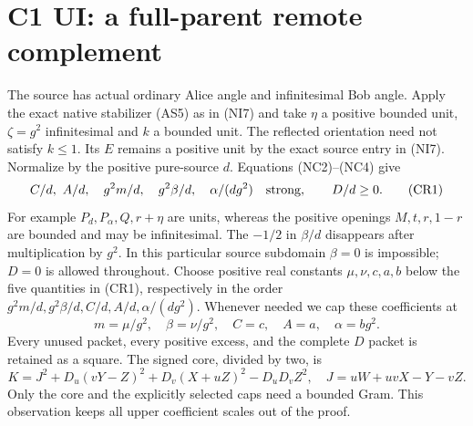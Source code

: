 \section{C1 UI: a full-parent remote complement}
\label{sec:c1-ui-remote}
The source has actual ordinary Alice angle and infinitesimal Bob
angle. Apply the exact native stabilizer (AS5) as in (NI7) and take
$\eta$ a positive bounded unit, $\zeta=g^2$ infinitesimal and $k$ a
bounded unit. The reflected orientation need not satisfy $k\le1$.
Its $E$ remains a positive unit by the exact source entry in (NI7).
Normalize by the positive pure-source $d$.
Equations (NC2)--(NC4) give
\[
 C/d,\ A/d,\quad g^2m/d,\quad g^2\beta/d,\quad
 \alpha/(dg^2)\quad\hbox{strong},\qquad D/d\ge0.       \tag{CR1}
\]
For example $P_d,P_\alpha,Q,r+\eta$ are units, whereas the
positive openings $M,t,r,1-r$ are bounded and may be infinitesimal.
The $-1/2$ in $\beta/d$ disappears after multiplication by $g^2$.
In this particular source subdomain $\beta=0$ is impossible; $D=0$
is allowed throughout. Choose positive real constants
$\mu,\nu,c,a,b$ below the five quantities in (CR1), respectively
in the order $g^2m/d,g^2\beta/d,C/d,A/d,\alpha/(dg^2)$.
Whenever needed we cap these coefficients at
\[
 m=\mu/g^2,\quad\beta=\nu/g^2,\quad C=c,\quad A=a,
 \quad\alpha=bg^2.                                  \tag{CR2}
\]
Every unused packet, every positive excess, and the complete $D$
packet is retained as a square. The signed core, divided by two, is
\[
 K=J^2+D_u(vY-Z)^2+D_v(X+uZ)^2-D_uD_vZ^2,
 \quad J=uW+uvX-Y-vZ.                              \tag{CR3}
\]
Only the core and the explicitly selected caps need a bounded Gram.
This observation keeps all upper coefficient scales out of the proof.

